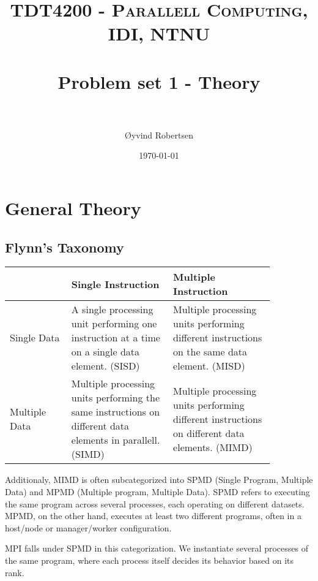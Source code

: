 \documentclass[paper=a4, fontsize=11pt]{scrartcl} %
\title{	
\normalfont \normalsize 
\textsc{TDT4200 - Parallell Computing, IDI, NTNU} \\ [25pt] %
\horrule{0.5pt} \\[0.4cm] %
\huge Problem set 1 - Theory \\ %
\horrule{2pt} \\[0.5cm] %
}
\author{Øyvind Robertsen} %
\date{\normalsize\today} %
\numberwithin{equation}{section} %
\numberwithin{figure}{section} %
\numberwithin{table}{section} %
\begin{document}
\maketitle %


\section{General Theory}

\subsection{Flynn's Taxonomy}


\begin{table}[h!]
    \begin{tabular}{|p{0.2\linewidth}|p{0.33\linewidth}|p{0.33\linewidth}|}
        \hline
    ~             & Single Instruction                                                                                  & Multiple Instruction                                                                   \\ \hline
        Single Data   & A single processing unit performing one instruction at a time on a single data element. (SISD)             & Multiple processing units performing different instructions on the same data element. (MISD)  \\ \hline
        Multiple Data & Multiple processing units performing the same instructions on different data elements in parallell. (SIMD) & Multiple processing units performing different instructions on different data elements. (MIMD) \\ \hline
    \end{tabular}
\end{table}

Additionaly, MIMD is often subcategorized into SPMD (Single Program, Multiple Data) and MPMD (Multiple program, Multiple Data).
SPMD refers to executing the same program across several processes, each operating on different datasets.
MPMD, on the other hand, executes at least two different programs, often in a host/node or manager/worker configuration.

MPI falls under SPMD in this categorization. We instantiate several processes of the same program, where each process itself decides its behavior based on its rank.
\end{document}
